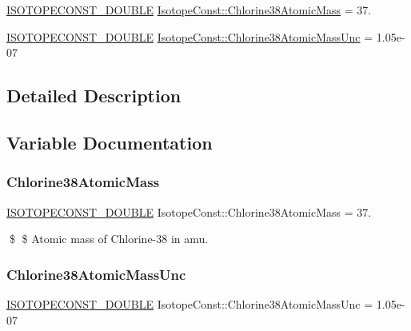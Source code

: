 \begin{DoxyCompactItemize}
\item 
\mbox{\hyperlink{group___isotope_const-_macros_ga8f45a7272ce02c0b4c65c44636ed719a}{I\+S\+O\+T\+O\+P\+E\+C\+O\+N\+S\+T\+\_\+\+D\+O\+U\+B\+LE}} \mbox{\hyperlink{group___isotope_const-_chlorine-_cl38_ga183cb4aa2445dc9b780b93ed1fe6e430}{Isotope\+Const\+::\+Chlorine38\+Atomic\+Mass}} = 37.
\item 
\mbox{\hyperlink{group___isotope_const-_macros_ga8f45a7272ce02c0b4c65c44636ed719a}{I\+S\+O\+T\+O\+P\+E\+C\+O\+N\+S\+T\+\_\+\+D\+O\+U\+B\+LE}} \mbox{\hyperlink{group___isotope_const-_chlorine-_cl38_gaa689fb967780bd3ad69e32e42c193457}{Isotope\+Const\+::\+Chlorine38\+Atomic\+Mass\+Unc}} = 1.\+05e-\/07
\end{DoxyCompactItemize}


\subsection{Detailed Description}


\subsection{Variable Documentation}
\mbox{\label{group___isotope_const-_chlorine-_cl38_ga183cb4aa2445dc9b780b93ed1fe6e430}} 
\subsubsection{\texorpdfstring{Chlorine38\+Atomic\+Mass}{Chlorine38AtomicMass}}
{\footnotesize\ttfamily \mbox{\hyperlink{group___isotope_const-_macros_ga8f45a7272ce02c0b4c65c44636ed719a}{I\+S\+O\+T\+O\+P\+E\+C\+O\+N\+S\+T\+\_\+\+D\+O\+U\+B\+LE}} Isotope\+Const\+::\+Chlorine38\+Atomic\+Mass = 37.}

\$ \$ Atomic mass of Chlorine-\/38 in amu. \mbox{\label{group___isotope_const-_chlorine-_cl38_gaa689fb967780bd3ad69e32e42c193457}} 
\subsubsection{\texorpdfstring{Chlorine38\+Atomic\+Mass\+Unc}{Chlorine38AtomicMassUnc}}
{\footnotesize\ttfamily \mbox{\hyperlink{group___isotope_const-_macros_ga8f45a7272ce02c0b4c65c44636ed719a}{I\+S\+O\+T\+O\+P\+E\+C\+O\+N\+S\+T\+\_\+\+D\+O\+U\+B\+LE}} Isotope\+Const\+::\+Chlorine38\+Atomic\+Mass\+Unc = 1.\+05e-\/07}

